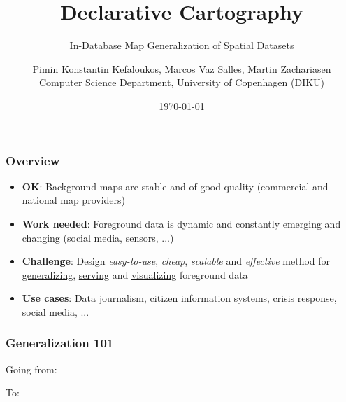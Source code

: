 \documentclass{beamer}
\title{Declarative Cartography}
\subtitle{In-Database Map Generalization of Spatial Datasets}
\author{\underline{Pimin Konstantin Kefaloukos}, Marcos Vaz Salles, Martin Zachariasen\\ \small{Computer Science Department, University of Copenhagen} (DIKU)}
\date{\today}
\begin{document}
\frame{\titlepage}

\frame
{
  \frametitle{Overview}
  \begin{center}
  \end{center}
  
  \begin{itemize}
  \item \textbf{OK}: Background maps are stable and of good quality (commercial and national map providers)
  \item \textbf{Work needed}: Foreground data is dynamic and constantly emerging and changing (social media, sensors, ...)
  \item \textbf{Challenge}: Design \emph{easy-to-use}, \emph{cheap}, \emph{scalable} and \emph{effective} method for \underline{generalizing}, \underline{serving} and \underline{visualizing} foreground data
  \item \textbf{Use cases}: Data journalism, citizen information systems, crisis response, social media, ...
  \end{itemize}

}

\frame
{
  \frametitle{Generalization 101}
  Going from:
  \begin{center}
  \end{center}
  To:
  \begin{center}
  \end{center}
}
\end{document}
